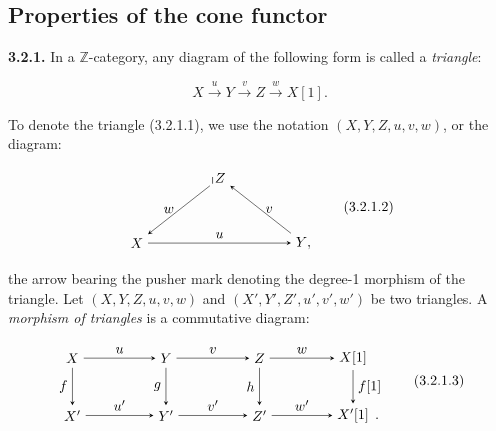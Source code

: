 \clearpage
{}%
\subsection{Properties of the cone functor}

\noindent\textbf{3.2.1.}\quad
{}
In a $\mathbb Z$-category, any diagram of the following form is called a
\emph{triangle}:

\begin{equation}
  X\xrightarrow{u}Y\xrightarrow{v}Z\xrightarrow{w}X[1].
  \tag{3.2.1.1}
\end{equation}

To denote the triangle (3.2.1.1), we use the notation
$(X,Y,Z,u,v,w)$, or the diagram:

\begin{equation}
  \begin{tikzpicture}[>=stealth,baseline=(current bounding box.center)]
    \node (X) at (0,0) {$X$};
    \node (Y) at (4.2,0) {$Y\mathpunct{,}$};
    \node (Z) at (2.1,1.65) {$Z$};
    \draw[->] (X) -- node[above] {$u$} (Y);
    \draw[->] (Y) -- node[right] {$v$} (Z);
    \draw[->] (Z) -- node[left] {$w$} (X);
    \draw[line width=0.45pt] (1.91,1.50) -- (1.91,1.67);
  \end{tikzpicture}
  \tag{3.2.1.2}
\end{equation}

the arrow bearing the pusher mark denoting the degree-1 morphism of the
triangle.
Let $(X,Y,Z,u,v,w)$ and $(X',Y',Z',u',v',w')$ be two triangles. A
\emph{morphism of triangles} is a commutative diagram:

\begin{equation}
  \begin{tikzpicture}[>=stealth,baseline=(current bounding box.center)]
    \node (X)  at (0,1.45) {$X$};
    \node (Y)  at (2.35,1.45) {$Y$};
    \node (Z)  at (4.70,1.45) {$Z$};
    \node (Xs) at (7.05,1.45) {$X[1]$};
    \node (Xp) at (0,0) {$X'$};
    \node (Yp) at (2.35,0) {$Y'$};
    \node (Zp) at (4.70,0) {$Z'$};
    \node (Xps) at (7.05,0) {$X'[1]$};
    \node[anchor=base west,inner sep=0pt,xshift=.08em] at (Xps.base east) {$.$};
    \draw[->] (X) -- node[above] {$u$} (Y);
    \draw[->] (Y) -- node[above] {$v$} (Z);
    \draw[->] (Z) -- node[above] {$w$} (Xs);
    \draw[->] (Xp) -- node[above] {$u'$} (Yp);
    \draw[->] (Yp) -- node[above] {$v'$} (Zp);
    \draw[->] (Zp) -- node[above] {$w'$} (Xps);
    \draw[->] (X) -- node[left] {$f$} (Xp);
    \draw[->] (Y) -- node[left] {$g$} (Yp);
    \draw[->] (Z) -- node[left] {$h$} (Zp);
    \draw[->] (Xs) -- node[right] {$f[1]$} (Xps);
  \end{tikzpicture}
  \tag{3.2.1.3}
\end{equation}

